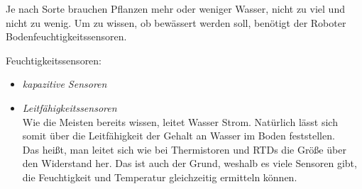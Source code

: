 		Je nach Sorte brauchen Pflanzen mehr oder weniger Wasser, nicht zu viel und nicht zu wenig. Um zu wissen, ob bewässert werden soll, benötigt der Roboter Bodenfeuchtigkeitssensoren.
		
		\begin{description}
			\item {Feuchtigkeitssensoren:}
			\begin{itemize}
				\item {\textit{kapazitive Sensoren}}\\
				
				\item {\textit{Leitfähigkeitssensoren}}\\
				Wie die Meisten bereits wissen, leitet Wasser Strom. Natürlich lässt sich somit über die Leitfähigkeit der Gehalt an Wasser im Boden feststellen.\\
				Das heißt, man leitet sich wie bei Thermistoren und RTDs die Größe über den Widerstand her. Das ist auch der Grund, weshalb es viele Sensoren gibt, die Feuchtigkeit und Temperatur gleichzeitig ermitteln können.
			\end{itemize}
		\end{description}
		